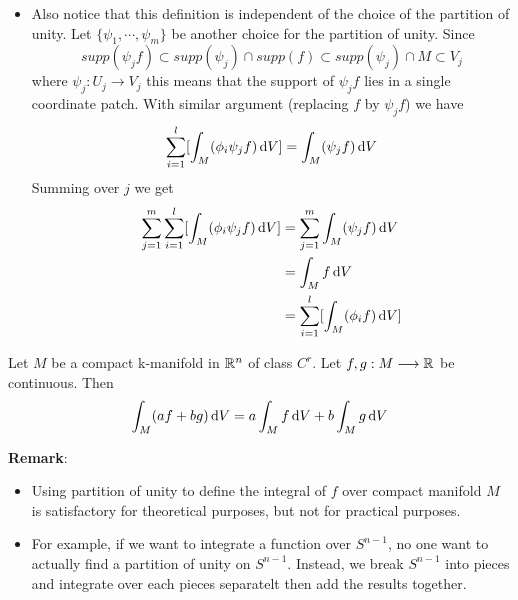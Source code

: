 \begin{itemize}
\begin{itemize}
    \end{itemize}
    After this process, we get $\{V_1'\cdots,V_t'\}$, which is a partition of $supp(f)$.For each part $V_k'$ of the manifold $M$, with similar argument we get
    $$\sum_{i=1}^l[\int_{V_k'}(\phi_if)\di V]=\int_{V_k'}f\di V$$
    Therefore we have 
    \begin{equation*}
        \begin{split}
            \sum_{i=1}^l[\int_M(\phi_if)\di V] &= \sum_{i=1}^l\sum_{k=1}^t[\int_{V_k'}(\phi_if)\di V]\\
            &= \sum_{k=1}^t\sum_{i=1}^l[\int_{V_k'}(\phi_if)\di V]\\
            &= \sum_{k=1}^t\int_{V_k'}f\di V\\
            &= \int_Mf\di V
        \end{split}
    \end{equation*}
    \item Also notice that this definition is independent of the choice of the partition of unity. Let $\{\psi_1,\cdots,\psi_m\}$ be another choice for the partition of unity. 
    Since $$supp(\psi_jf)\subset supp(\psi_j)\cap supp(f)\subset supp(\psi_j)\cap M\subset V_j$$ where $\psi_j:U_j\longrightarrow V_j$ this means that the support of $\psi_jf$ lies in a single coordinate patch. With similar argument (replacing $f$ by $\psi_jf$) we have 
    $$\sum_{i=1}^l[\int_M(\phi_i\psi_jf)\operatorname{d\!} V]=\int_M(\psi_jf)\operatorname{d\!} V$$ 
    Summing over $j$ we get 
    \begin{equation*}
        \begin{split}
            \sum_{j=1}^m\sum_{i=1}^l[\int_M(\phi_i\psi_jf)\operatorname{d\!} V] &= \sum_{j=1}^m\int_M(\psi_jf)\operatorname{d\!} V\\
            &= \int_Mf\operatorname{d\!} V\\
            &= \sum_{i=1}^l[\int_M(\phi_if)\operatorname{d\!} V]
        \end{split}
    \end{equation*}
\end{itemize}

\begin{theorem}
    Let $M$ be a compact k-manifold in $\mathbb{R}^n$ of class $C^r$. Let $f,g:M\longrightarrow \mathbb{R}$ be continuous. Then 
    $$\int_M(af+bg)\operatorname{d\!} V =a \int_M f\operatorname{d\!} V + b\int_M g \operatorname{d\!} V$$
\end{theorem}
\noindent\textbf{Remark}:
\begin{itemize}
    \item Using partition of unity to define the integral of $f$ over compact manifold $M$ is satisfactory for theoretical purposes, but not for practical purposes. 
    \item For example, if we want to integrate a function over $S^{n-1}$, no one want to actually find a partition of unity on $S^{n-1}$. Instead, we break $S^{n-1}$ into pieces and integrate over each pieces separatelt then add the results together.
\end{itemize}


